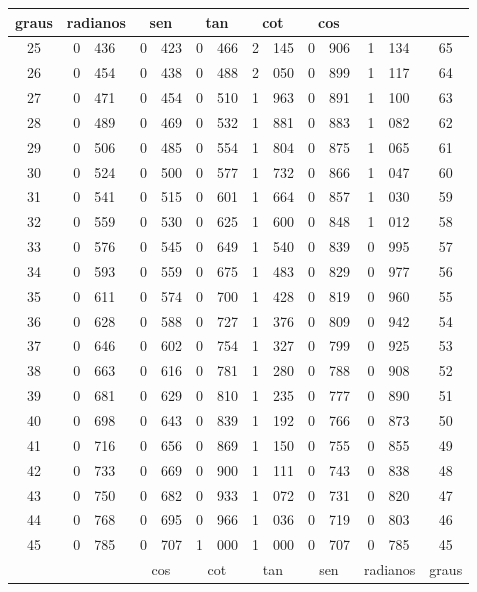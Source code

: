 \begin{tabular}{c|r@{,}l|r@{,}l r@{,}l r@{,}l r@{,}l|r@{,}l|c}
  \hline
  graus & \multicolumn{2}{c|}{radianos} & \multicolumn{2}{c}{sen} & \multicolumn{2}{c}{tan} & \multicolumn{2}{c}{cot} & \multicolumn{2}{c|}{cos} & \multicolumn{2}{c|}{ } & \\
  \hline
  25 & 0&436 & 0&423 & 0&466 & 2&145 & 0&906 & 1&134 & 65 \\
  26 & 0&454 & 0&438 & 0&488 & 2&050 & 0&899 & 1&117 & 64 \\
  27 & 0&471 & 0&454 & 0&510 & 1&963 & 0&891 & 1&100 & 63 \\
  28 & 0&489 & 0&469 & 0&532 & 1&881 & 0&883 & 1&082 & 62 \\
  29 & 0&506 & 0&485 & 0&554 & 1&804 & 0&875 & 1&065 & 61 \\
  30 & 0&524 & 0&500 & 0&577 & 1&732 & 0&866 & 1&047 & 60 \\
  31 & 0&541 & 0&515 & 0&601 & 1&664 & 0&857 & 1&030 & 59 \\
  32 & 0&559 & 0&530 & 0&625 & 1&600 & 0&848 & 1&012 & 58 \\
  33 & 0&576 & 0&545 & 0&649 & 1&540 & 0&839 & 0&995 & 57 \\
  34 & 0&593 & 0&559 & 0&675 & 1&483 & 0&829 & 0&977 & 56 \\
  35 & 0&611 & 0&574 & 0&700 & 1&428 & 0&819 & 0&960 & 55 \\
  36 & 0&628 & 0&588 & 0&727 & 1&376 & 0&809 & 0&942 & 54 \\
  37 & 0&646 & 0&602 & 0&754 & 1&327 & 0&799 & 0&925 & 53 \\
  38 & 0&663 & 0&616 & 0&781 & 1&280 & 0&788 & 0&908 & 52 \\
  39 & 0&681 & 0&629 & 0&810 & 1&235 & 0&777 & 0&890 & 51 \\
  40 & 0&698 & 0&643 & 0&839 & 1&192 & 0&766 & 0&873 & 50 \\
  41 & 0&716 & 0&656 & 0&869 & 1&150 & 0&755 & 0&855 & 49 \\
  42 & 0&733 & 0&669 & 0&900 & 1&111 & 0&743 & 0&838 & 48 \\
  43 & 0&750 & 0&682 & 0&933 & 1&072 & 0&731 & 0&820 & 47 \\
  44 & 0&768 & 0&695 & 0&966 & 1&036 & 0&719 & 0&803 & 46 \\
  45 & 0&785 & 0&707 & 1&000 & 1&000 & 0&707 & 0&785 & 45 \\
  \hline
    & \multicolumn{2}{c|}{ } & \multicolumn{2}{c}{cos} & \multicolumn{2}{c}{cot} & \multicolumn{2}{c}{tan} & \multicolumn{2}{c|}{sen} & \multicolumn{2}{c|}{radianos} & graus \\
  \hline
\end{tabular}

